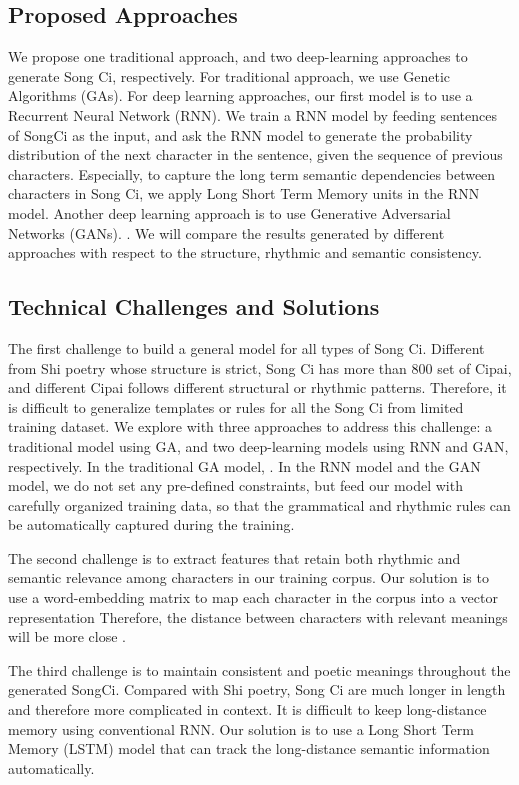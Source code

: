 \subsection{Proposed Approaches} 
%
We propose one traditional approach, and two deep-learning approaches to generate Song Ci, respectively.
%
For traditional approach, we use Genetic Algorithms (GAs).
%
For deep learning approaches, our first model is to use a Recurrent Neural Network (RNN).
%
We train a RNN model by feeding sentences of SongCi as the input, and ask the RNN model to generate the probability distribution of the next character in the sentence, given the sequence of previous characters.
%
Especially, to capture the long term semantic dependencies between characters in Song Ci,
%
we apply Long Short Term Memory units in the RNN model. 
Another deep learning approach is to use Generative Adversarial Networks (GANs).
%
.
%
We will compare the results generated by different approaches with respect to the structure, rhythmic and semantic consistency.
 
\subsection{Technical Challenges and Solutions} 
The first challenge to build a general model for all types of Song Ci.
%
Different from Shi poetry whose structure is strict,  Song Ci has more than 800 set of Cipai, and different Cipai follows different structural or rhythmic patterns.
%
Therefore, it is difficult to generalize templates or rules for all the Song Ci from limited training dataset.
% 
We explore with three approaches to address this challenge: a traditional model using GA, and two deep-learning models using RNN and GAN, respectively.
%
In the traditional GA model, .
% 
In the RNN model and the GAN model, we do not set any pre-defined constraints, but feed our model with carefully organized training data, so that the grammatical and rhythmic rules can be automatically captured during the training.

The second challenge is to extract features that retain both rhythmic and semantic relevance among characters in our training corpus. 
%
Our solution is to use a word-embedding matrix to map each character in the corpus into a vector representation
%
Therefore, the distance between characters with relevant meanings will be more close . 

The third challenge is to maintain consistent and poetic meanings throughout the generated SongCi.
%
Compared with Shi poetry, Song Ci are much longer in length and therefore more complicated in context.
%
It is difficult to keep long-distance memory using conventional RNN.
% 
Our solution is to use a Long Short Term Memory (LSTM) model that can track the long-distance semantic information automatically. 
